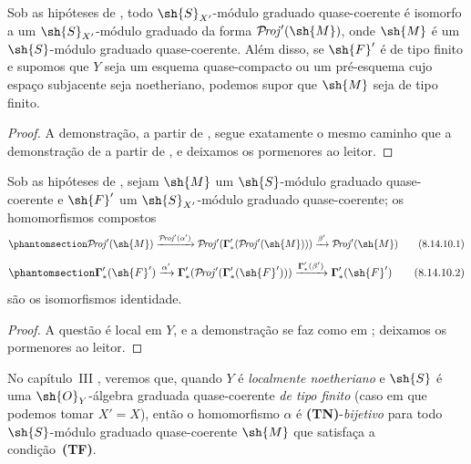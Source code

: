 \documentclass[oneside,10pt]{amsart}
\def\shProj{\mathcal{P}\!\mathit{roj}}
\newcommand{\oldpage}[2][]{\marginnote{\normalfont\footnotesize\textbf{#1}~|~#2}\ignorespaces}
\let\EGAOriginalLabel\label
\renewcommand{\label}[1]{\phantomsection\EGAOriginalLabel{#1}}
\begin{document}
\begin{corollary}[8.14.9]
\label{II.8.14.9}
Sob as hipóteses de , todo $\sh{S}_{X'}$-módulo graduado quase-coerente é isomorfo a um $\sh{S}_{X'}$-módulo graduado da forma $\shProj'(\sh{M})$, onde $\sh{M}$ é um $\sh{S}$-módulo graduado quase-coerente.
Além disso, se $\sh{F}'$ é de tipo finito e supomos que $Y$ seja um esquema quase-compacto ou um pré-esquema cujo espaço subjacente seja noetheriano, podemos supor que $\sh{M}$ seja de tipo finito.
\end{corollary}

\begin{proof}
A demonstração, a partir de , segue exatamente o mesmo caminho que a demonstração de  a partir de , e deixamos os pormenores ao leitor.
\end{proof}

\begin{proposition}[8.14.10]
\label{II.8.14.10}
Sob as hipóteses de , sejam $\sh{M}$ um $\sh{S}$-módulo graduado quase-coerente e $\sh{F}'$ um $\sh{S}_{X'}$-módulo graduado quase-coerente;
os homomorfismos compostos
\[
\label{II.8.14.10.1}
    \shProj'(\sh{M})
    \xrightarrow{\shProj'(\alpha')}
    \shProj'(\boldsymbol{\Gamma}'_*(\shProj'(\sh{M})))
    \xrightarrow{\beta'}
    \shProj'(\sh{M})
\tag{8.14.10.1}
\]
\[
\label{II.8.14.10.2}
    \boldsymbol{\Gamma}'_*(\sh{F}')
    \xrightarrow{\alpha'}
    \boldsymbol{\Gamma}'_*(\shProj'(\boldsymbol{\Gamma}'_*(\sh{F}')))
    \xrightarrow{\boldsymbol{\Gamma}'_*(\beta')}
    \boldsymbol{\Gamma}'_*(\sh{F}')
\tag{8.14.10.2}
\]
são os isomorfismos identidade.
\end{proposition}

\begin{proof}
A questão é local em $Y$, e a demonstração se faz como em ;
deixamos os pormenores ao leitor.
\end{proof}

\begin{remark}[8.14.11]
\label{II.8.14.11}
No capítulo~III , veremos que, quando $Y$ é \emph{localmente noetheriano} e $\sh{S}$ é uma $\sh{O}_Y$-álgebra graduada quase-coerente \emph{de tipo finito} (caso em que
\oldpage[II]{201}
podemos tomar $X'=X$), então o homomorfismo $\alpha$  é \textbf{(TN)}-\emph{bijetivo} para todo $\sh{S}$-módulo graduado quase-coerente $\sh{M}$ que satisfaça a condição~\textbf{(TF)}.
\end{remark}
\end{document}
